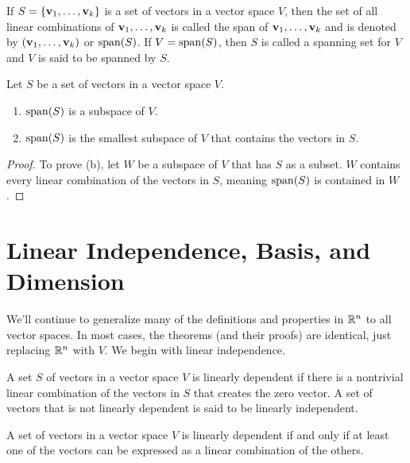 \documentclass[../m073main.tex]{subfiles}
\begin{document}
\begin{definition}[Span]
	If $S = \{\mathbf{v}_1, \ldots, \mathbf{v}_{k}\}$ is a set of vectors in a vector space $V$, then the set of all linear combinations of $\mathbf{v}_1, \ldots, \mathbf{v}_k$ is called the span of $\mathbf{v}_1, \ldots, \mathbf{v}_k$ and is denoted by $(\mathbf{v}_1, \ldots, \mathbf{v}_k)$ or $\operatorname{span}(S)$.
	If $V = \operatorname{span}(S)$, then $S$ is called a spanning set for $V$ and $V$ is said to be spanned by $S$.
\end{definition}

\begin{theorem}
	Let $S$ be a set of vectors in a vector space $V$.
	\begin{enumerate}[label=(\alph*),topsep=0pt]
		\item $\operatorname{span}(S)$ is a subspace of $V$.
		\item $\operatorname{span}(S)$ is the smallest subspace of $V$ that contains the vectors in $S$.
	\end{enumerate}
\end{theorem}

\begin{proof}
	To prove (b), let $W$ be a subspace of $V$ that has $S$ as a subset.
	$W$ contains every linear combination of the vectors in $S$, meaning $\operatorname{span}(S)$ is contained in $W$.
\end{proof}


\section{Linear Independence, Basis, and Dimension}
We'll continue to generalize many of the definitions and properties in $\mathbb{R}^n$ to all vector spaces.
In most cases, the theorems (and their proofs) are identical, just replacing $\mathbb{R}^n$ with $V$.
We begin with linear independence.

\begin{definition}
	A set $S$ of vectors in a vector space $V$ is linearly dependent if there is a nontrivial linear combination of the vectors in $S$ that creates the zero vector.
	A set of vectors that is not linearly dependent is said to be linearly independent.
\end{definition}

\begin{theorem}
	A set of vectors in a vector space $V$ is linearly dependent if and only if at least one of the vectors can be expressed as a linear combination of the others.
\end{theorem}
\end{document}
